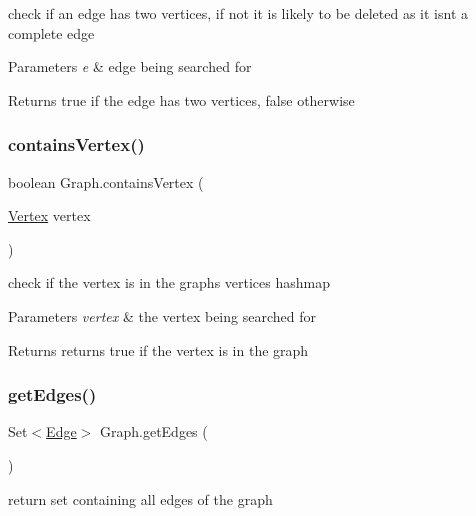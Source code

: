 check if an edge has two vertices, if not it is likely to be deleted as it isn\textquotesingle{}t a complete edge 


\begin{DoxyParams}{Parameters}
{\em e} & edge being searched for \\
\hline
\end{DoxyParams}
\begin{DoxyReturn}{Returns}
true if the edge has two vertices, false otherwise 
\end{DoxyReturn}
\mbox{\label{class_graph_a0380eb64afa8f2264eb2472bf62490a2}} 
\subsubsection{\texorpdfstring{contains\+Vertex()}{containsVertex()}}
{\footnotesize\ttfamily boolean Graph.\+contains\+Vertex (\begin{DoxyParamCaption}\item[{\hyperlink{class_vertex}{Vertex}}]{vertex }\end{DoxyParamCaption})}



check if the vertex is in the graphs vertices hashmap 


\begin{DoxyParams}{Parameters}
{\em vertex} & the vertex being searched for \\
\hline
\end{DoxyParams}
\begin{DoxyReturn}{Returns}
returns true if the vertex is in the graph 
\end{DoxyReturn}
\mbox{\label{class_graph_a292e75a764615c537377c66a1deece30}} 
\subsubsection{\texorpdfstring{get\+Edges()}{getEdges()}}
{\footnotesize\ttfamily Set$<$\hyperlink{class_edge}{Edge}$>$ Graph.\+get\+Edges (\begin{DoxyParamCaption}{ }\end{DoxyParamCaption})}



return set containing all edges of the graph 

